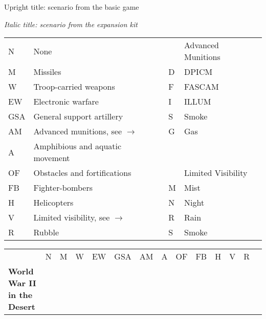 \documentclass[a4paper]{article}
\newenvironment{texte}{\rmfamily\footnotesize}{}
\begin{document}
\begin{texte}


Upright title: scenario from the basic game

\textit{Italic title: scenario from the expansion kit}

\vspace*{5mm}

\begin{tabular}{llll}
N    &   None                                  &   & Advanced Munitions\\
M    &   Missiles                              & D & DPICM  \\
W    &   Troop-carried weapons                 & F & FASCAM \\
EW   &   Electronic warfare                    & I & ILLUM  \\
GSA  &   General support artillery             & S & Smoke  \\
AM   &   Advanced munitions, see $\rightarrow$ & G & Gas    \\
A    &   Amphibious and aquatic movement  \\
OF   &   Obstacles and fortifications          &   & Limited Visibility \\
FB   &   Fighter-bombers                       & M & Mist   \\
H    &   Helicopters                           & N & Night  \\
V    &   Limited visibility, see $\rightarrow$ & R & Rain   \\
R    &   Rubble                                & S & Smoke  \\
\end{tabular}

\begin{tabular}{lccccccccccccl}
                                                   & N &  M &  W & EW & GSA & AM & A & OF & FB & H &  V & R \\

\bf World War II in the Desert \\


\end{tabular}
\end{texte}
\end{document}
